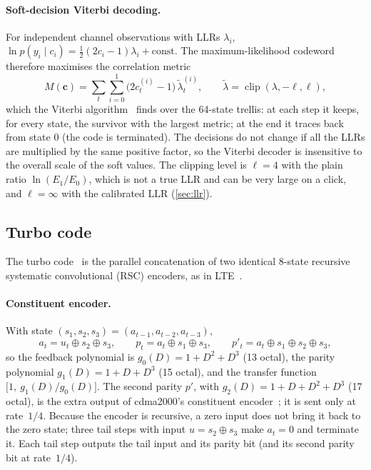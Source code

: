 \documentclass[11pt,a4paper]{article}
\newcommand{\clip}{\operatorname{clip}}
\theoremstyle{remark}
\begin{document}
\paragraph{Soft-decision Viterbi decoding.}
For independent channel observations with LLRs $\lambda_i$, $\ln p(y_i \mid c_i) = \tfrac12 (2c_i - 1)\lambda_i + \text{const}$. The maximum-likelihood codeword therefore maximises the correlation metric
\begin{equation}
M(\bm c) = \sum_t \sum_{i=0}^{1} \bigl(2c_t^{(i)} - 1\bigr)\, \tilde\lambda_t^{(i)}, \qquad \tilde\lambda = \clip(\lambda, -\ell, \ell),
\label{eq:viterbi}
\end{equation}
which the Viterbi algorithm~\cite{viterbi,forneyva} finds over the 64-state trellis: at each step it keeps, for every state, the survivor with the largest metric; at the end it traces back from state 0 (the code is terminated). The decisions do not change if all the LLRs are multiplied by the same positive factor, so the Viterbi decoder is insensitive to the overall scale of the soft values. The clipping level is $\ell = 4$ with the plain ratio $\ln(E_1/E_0)$, which is not a true LLR and can be very large on a click, and $\ell = \infty$ with the calibrated LLR (\cref{sec:llr}).

\subsection{Turbo code}
\label{sec:turbo}
The turbo code~\cite{berrou} is the parallel concatenation of two identical 8-state recursive systematic convolutional (RSC) encoders, as in LTE~\cite{ts36212}.

\paragraph{Constituent encoder.}
With state $(s_1, s_2, s_3) = (a_{t-1}, a_{t-2}, a_{t-3})$,
\begin{equation}
a_t = u_t \oplus s_2 \oplus s_3, \qquad p_t = a_t \oplus s_1 \oplus s_3, \qquad p'_t = a_t \oplus s_1 \oplus s_2 \oplus s_3,
\end{equation}
so the feedback polynomial is $g_0(D) = 1 + D^2 + D^3$ (13 octal), the parity polynomial $g_1(D) = 1 + D + D^3$ (15 octal), and the transfer function $\bigl[1,\ g_1(D)/g_0(D)\bigr]$. The second parity $p'$, with $g_2(D) = 1 + D + D^2 + D^3$ (17 octal), is the extra output of cdma2000's constituent encoder~\cite{cdma2000}; it is sent only at rate~$1/4$. Because the encoder is recursive, a zero input does not bring it back to the zero state; three tail steps with input $u = s_2 \oplus s_3$ make $a_t = 0$ and terminate it. Each tail step outputs the tail input and its parity bit (and its second parity bit at rate~$1/4$).
\end{document}
